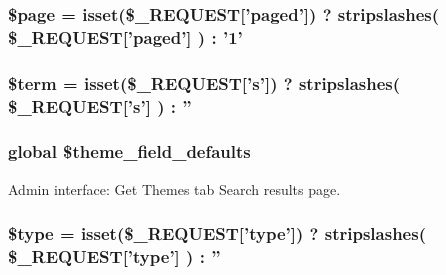 \label{dc/dd5/themes__results_8php_a0f69f43fc8498682cb8f6d9b8f62f1b5}
\hypertarget{themes__results_8php_a0a44e6760141442bb439b1ab1395d8ff}{
\subsubsection[{\$page}]{\setlength{\rightskip}{0pt plus 5cm}\$page = isset(\$\_\-REQUEST\mbox{[}'paged'\mbox{]}) ? stripslashes( \$\_\-REQUEST\mbox{[}'paged'\mbox{]} ) : '1'}}
\label{dc/dd5/themes__results_8php_a0a44e6760141442bb439b1ab1395d8ff}
\hypertarget{themes__results_8php_aab8e9e6e6b80da234ae2c60691f73262}{
\subsubsection[{\$term}]{\setlength{\rightskip}{0pt plus 5cm}\$term = isset(\$\_\-REQUEST\mbox{[}'s'\mbox{]}) ? stripslashes( \$\_\-REQUEST\mbox{[}'s'\mbox{]} ) : ''}}
\label{dc/dd5/themes__results_8php_aab8e9e6e6b80da234ae2c60691f73262}
\hypertarget{themes__results_8php_a6c17fd9a4fddc96f2a404e3fb642f264}{
\subsubsection[{\$theme\_\-field\_\-defaults}]{\setlength{\rightskip}{0pt plus 5cm}global \$theme\_\-field\_\-defaults}}
\label{dc/dd5/themes__results_8php_a6c17fd9a4fddc96f2a404e3fb642f264}


Admin interface: Get Themes tab Search results page. 

\hypertarget{themes__results_8php_a9a4a6fba2208984cabb3afacadf33919}{
\subsubsection[{\$type}]{\setlength{\rightskip}{0pt plus 5cm}\$type = isset(\$\_\-REQUEST\mbox{[}'type'\mbox{]}) ? stripslashes( \$\_\-REQUEST\mbox{[}'type'\mbox{]} ) : ''}}
\label{dc/dd5/themes__results_8php_a9a4a6fba2208984cabb3afacadf33919}
